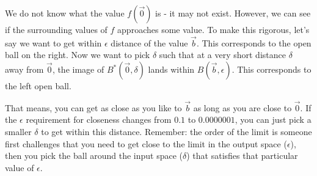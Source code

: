 We do not know what the value $f(\vec{0})$ is - it may not exist. However, we can see if the surrounding values of $f$ approaches some value. To make this rigorous, let's say we want to get within $\epsilon$ distance of the value $\vec{b}$. This corresponds to the open ball on the right. Now we want to pick $\delta$ such that at a very short distance $\delta$ away from $\vec{0}$, the image of $B^*(\vec{0},\delta)$ lands within $B(\vec{b},\epsilon)$. This corresponds to the left open ball.

That means, you can get as close as you like to $\vec{b}$ as long as you are close to $\vec{0}$. If the $\epsilon$ requirement for closeness changes from $0.1$ to $0.0000001$, you can just pick a smaller $\delta$ to get within this distance. Remember: the order of the limit is someone first challenges that you need to get close to the limit in the output space ($\epsilon$), then you pick the ball around the input space ($\delta$) that satisfies that particular value of $\epsilon$.

